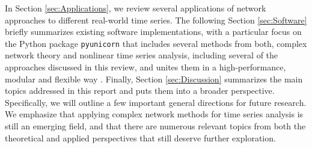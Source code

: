 In Section \ref{sec:Applications}, we review several applications of network approaches to different real-world time series. The following Section \ref{sec:Software} briefly summarizes existing software implementations, with a particular focus on the Python package \texttt{pyunicorn} that includes several methods from both, complex network theory and nonlinear time series analysis, including several of the approaches discussed in this review, and unites them in a high-performance, modular and flexible way \cite{Donges2015}. Finally, Section \ref{sec:Discussion} summarizes the main topics addressed in this report and puts them into a broader perspective. Specifically, we will outline a few important general directions for future research. We emphasize that applying complex network methods for time series analysis is still an emerging field, and that there are numerous relevant topics from both the theoretical and applied perspectives that still deserve further exploration.


